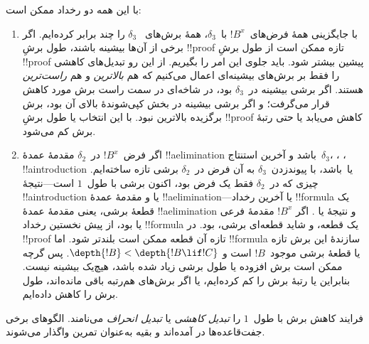 \documentclass[../../../include/open-logic-section]{subfiles}
\begin{document}
با این همه دو رخداد ممکن است:
\begin{enumerate}
  \item با جایگزینی همهٔ فرض‌های~$!B^x$ با~$\delta_3$، همهٔ برش‌های
  ~‌$\delta_3$ را چند برابر کرده‌ایم. اگر برخی از آن‌ها بیشینه باشند،
  طول برشِ !!{proof} تازه ممکن است از طول برشِ !!{proof} پیشین بیشتر
  شود. باید جلوی این امر را بگیریم. از این رو تبدیل‌های کاهشی را فقط
  بر برش‌های بیشینه‌ای اعمال می‌کنیم که هم \emph{بالاترین} و هم
  \emph{راست‌ترین} هستند. اگر برشی بیشینه در~$\delta_3$ بود، در شاخه‌ای
  در سمت راست برش مورد کاهش قرار می‌گرفت؛ و اگر برشی بیشینه در بخش
  کپی‌شوندهٔ بالای آن بود، برش برگزیده بالاترین نبود. با این انتخاب یا
  طول برشِ !!{proof} کاهش می‌یابد یا حتی رتبهٔ برش کم می‌شود.

  \item اگر فرض~$!B^x$ در~$\delta_2$ مقدمهٔ عمدهٔ !!a{elimination}
  باشد و آخرین استنتاج~$\delta_3$، \Elim{\lor}، \Elim{\lexists}،
  !!a{introduction} یا~\FalseInt باشد، با پیوندزدن~$\delta_3$ به آن
  فرض در~$\delta_2$ برشی تازه ساخته‌ایم. چیزی که در~$\delta_2$ فقط یک
  فرض بود، اکنون برشی با طول~$1$ است---نتیجهٔ !!a{introduction} یا
  \FalseInt و مقدمهٔ عمدهٔ !!a{elimination}---یا آخرین رخداد
  !!{formula} یک قطعهٔ برشی، یعنی مقدمهٔ عمدهٔ !!a{elimination} و
  نتیجهٔ \Elim{\lor} یا \Elim{\lexists}. اگر $!B^x$ مقدمهٔ فرعی
  \Elim{\lor} یا \Elim{\lexists} بود، از پیش نخستین رخداد
  !!{formula} یک قطعه، و شاید قطعه‌ای برشی، بود. در !!{proof} تازه آن
  قطعه ممکن است بلندتر شود. اما !!{formula} سازندهٔ این برش تازه یا
  قطعهٔ برشی موجود~$!B$ است و
  $\depth{!B}<\depth{!B\lif !C}$. پس گرچه ممکن است برش افزوده یا طول
  برشی زیاد شده باشد، هیچ‌یک بیشینه نیست. بنابراین یا رتبهٔ برش را کم
  کرده‌ایم، یا اگر برش‌های هم‌رتبه باقی مانده‌اند، طول برش را کاهش
  داده‌ایم.
\end{enumerate}

فرایند کاهش برش با طول~$1$ را \emph{تبدیل کاهشی} یا \emph{تبدیل
انحراف} می‌نامند. الگوهای برخی جفت‌قاعده‌ها در
 آمده‌اند و بقیه به‌عنوان تمرین واگذار
می‌شوند.
\end{document}
